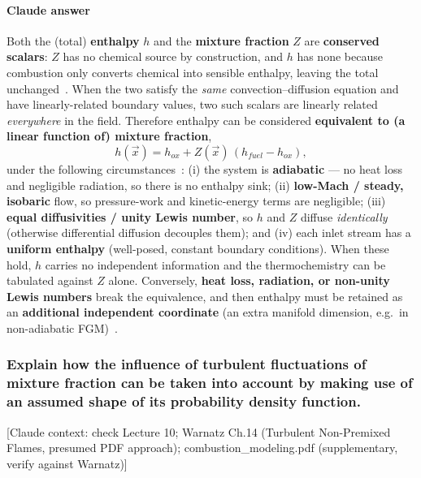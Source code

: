 {\color{istblue}
\paragraph{Claude answer}
Both the (total) \textbf{enthalpy} $h$ and the \textbf{mixture fraction} $Z$ are \textbf{conserved scalars}: $Z$ has no chemical source by construction, and $h$ has none because combustion only converts chemical into sensible enthalpy, leaving the total unchanged~\cite{lecture8,warnatz2006combustion}. When the two satisfy the \emph{same} convection--diffusion equation and have linearly-related boundary values, two such scalars are linearly related \emph{everywhere} in the field. Therefore enthalpy can be considered \textbf{equivalent to (a linear function of) mixture fraction},
\begin{equation*}
h(\vec x) = h_{ox} + Z(\vec x)\,(h_{fuel} - h_{ox}),
\end{equation*}
under the following circumstances~\cite{lecture9,peters2000turbulent,poinsot2012theoretical}: (i) the system is \textbf{adiabatic} --- no heat loss and negligible radiation, so there is no enthalpy sink; (ii) \textbf{low-Mach / steady, isobaric} flow, so pressure-work and kinetic-energy terms are negligible; (iii) \textbf{equal diffusivities / unity Lewis number}, so $h$ and $Z$ diffuse \emph{identically} (otherwise differential diffusion decouples them); and (iv) each inlet stream has a \textbf{uniform enthalpy} (well-posed, constant boundary conditions). When these hold, $h$ carries no independent information and the thermochemistry can be tabulated against $Z$ alone. Conversely, \textbf{heat loss, radiation, or non-unity Lewis numbers} break the equivalence, and then enthalpy must be retained as an \textbf{additional independent coordinate} (an extra manifold dimension, e.g.\ in non-adiabatic FGM)~\cite{warnatz2006combustion,lecture10}.
}




\subsubsection{Explain how the influence of turbulent fluctuations of mixture fraction can be taken into account by making use of an assumed shape of its probability density function.}

{\color{gray}\footnotesize [Claude context: check Lecture 10; Warnatz Ch.14 (Turbulent Non-Premixed Flames, presumed PDF approach); combustion\_modeling.pdf (supplementary, verify against Warnatz)]}

